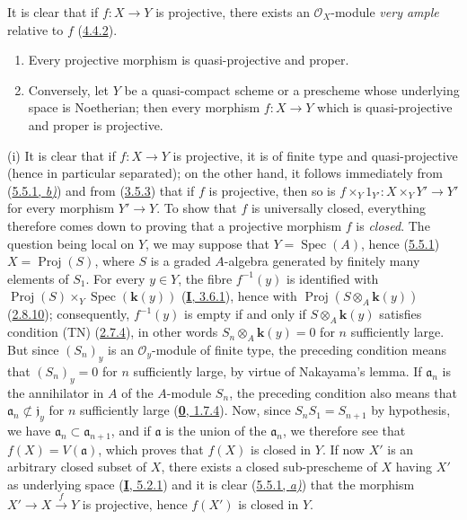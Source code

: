 It is clear that if $f:X\to Y$ is projective, there exists an
$\mathcal{O}_X$-module \emph{very ample} relative to $f$
(\hyperref[II.4.4.2]{4.4.2}).

\begin{theorem}[5.5.3]
\label{II.5.5.3}
\begin{enumerate}
  \item[\rm{(i)}] Every projective morphism is quasi-projective and proper.
  \item[\rm{(ii)}] Conversely, let $Y$ be a quasi-compact scheme or a
  prescheme whose underlying space is Noetherian; then every morphism
  $f:X\to Y$ which is quasi-projective and proper is projective.
\end{enumerate}
\end{theorem}

(i) It is clear that if $f:X\to Y$ is projective, it is of finite type and
quasi-projective (hence in particular separated); on the other hand, it
follows immediately from (\hyperref[II.5.5.1]{5.5.1, \emph{b)}}) and from
(\hyperref[II.3.5.3]{3.5.3}) that if $f$ is projective, then so is
$f\times_Y1_{Y'}:X\times_YY'\to Y'$ for every morphism $Y'\to Y$. To show
that $f$ is universally closed, everything therefore comes down to proving
that a projective morphism $f$ is \emph{closed}. The question being local on
$Y$, we may suppose that $Y=\operatorname{Spec}(A)$, hence
(\hyperref[II.5.5.1]{5.5.1}) $X=\operatorname{Proj}(S)$, where $S$ is a
graded $A$-algebra generated by finitely many elements of $S_1$. For
every $y\in Y$, the fibre $f^{-1}(y)$ is identified with
$\operatorname{Proj}(S)\times_Y\operatorname{Spec}(\boldsymbol{k}(y))$
(\hyperref[I.3.6.1]{\textbf{I}, 3.6.1}), hence with
$\operatorname{Proj}(S\otimes_A\boldsymbol{k}(y))$
(\hyperref[II.2.8.10]{2.8.10}); consequently, $f^{-1}(y)$ is empty if and
only if $S\otimes_A\boldsymbol{k}(y)$ satisfies condition (TN)
(\hyperref[II.2.7.4]{2.7.4}), in other words $S_n\otimes_A\boldsymbol{k}(y)=0$ for $n$
sufficiently large. But since $(S_n)_y$ is an $\mathcal{O}_y$-module of
finite type, the preceding condition means that $(S_n)_y=0$ for $n$
sufficiently large, by virtue of Nakayama's lemma. If $\mathfrak a_n$ is the
annihilator in $A$ of the $A$-module $S_n$, the preceding condition also
means that $\mathfrak a_n\not\subset\mathfrak j_y$ for $n$ sufficiently large
(\hyperref[0.1.7.4]{\textbf{0}, 1.7.4}). Now, since $S_nS_1=S_{n+1}$ by hypothesis,
we have $\mathfrak a_n\subset\mathfrak a_{n+1}$, and if $\mathfrak a$ is the
union of the $\mathfrak a_n$, we therefore see that $f(X)=V(\mathfrak a)$,
which proves that $f(X)$ is closed in $Y$. If now $X'$ is an arbitrary closed
subset of $X$, there exists a closed sub-prescheme of $X$ having $X'$
as underlying space (\hyperref[I.5.2.1]{\textbf{I}, 5.2.1}) and it is clear
(\hyperref[II.5.5.1]{5.5.1, \emph{a)}}) that the morphism
$X'\to X\xrightarrow{f}Y$ is projective, hence $f(X')$ is closed in $Y$.


